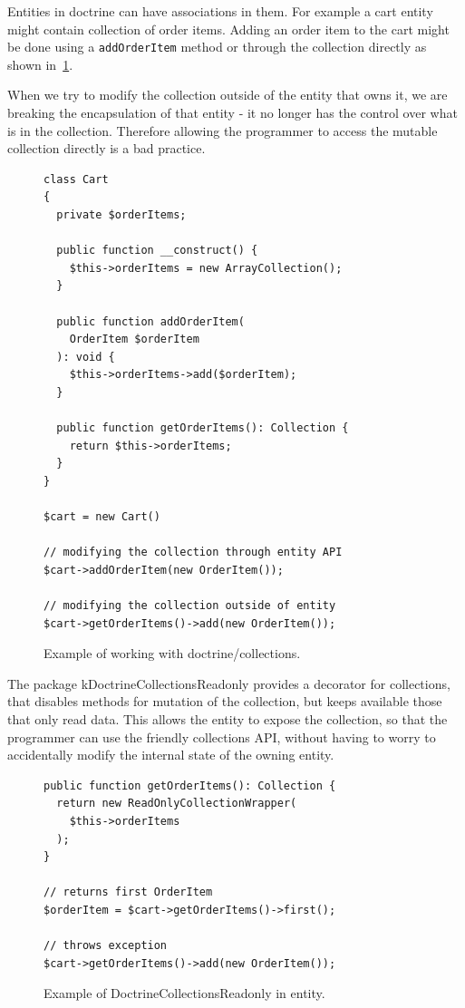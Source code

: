  \label{sec:state:doctrine-collections-readonly}

Entities in \gls{doctrine} can have associations in them. For example a cart entity might contain collection of order items. Adding an order item to the cart might be done using a \lstinline{addOrderItem} method or through the collection directly as shown in~\ref{fig:collections-readonly:example}.

When we try to modify the collection outside of the entity that owns it, we are breaking the encapsulation of that entity - it no longer has the control over what is in the collection. Therefore allowing the programmer to access the mutable collection directly is a bad practice.

\begin{figure} \label{fig:collections-readonly:example}
\begin{lstlisting}
class Cart
{
  private $orderItems;

  public function __construct() {
    $this->orderItems = new ArrayCollection();
  }

  public function addOrderItem(
    OrderItem $orderItem
  ): void {
    $this->orderItems->add($orderItem);
  }

  public function getOrderItems(): Collection {
    return $this->orderItems;
  }
}

$cart = new Cart()

// modifying the collection through entity API
$cart->addOrderItem(new OrderItem());

// modifying the collection outside of entity
$cart->getOrderItems()->add(new OrderItem());
\end{lstlisting}
\caption{Example of working with doctrine/collections.}
\end{figure}

The package \gls{kDoctrineCollectionsReadonly} provides a decorator for collections, that disables methods for mutation of the collection, but keeps available those that only read data. This allows the entity to expose the collection, so that the programmer can use the friendly collections API, without having to worry to accidentally modify the internal state of the owning entity.

\begin{figure} \label{fig:collections-readonly:readonly}
\begin{lstlisting}
public function getOrderItems(): Collection {
  return new ReadOnlyCollectionWrapper(
    $this->orderItems
  );
}

// returns first OrderItem
$orderItem = $cart->getOrderItems()->first();

// throws exception
$cart->getOrderItems()->add(new OrderItem());
\end{lstlisting}
\caption{Example of DoctrineCollectionsReadonly in entity.}
\end{figure}

